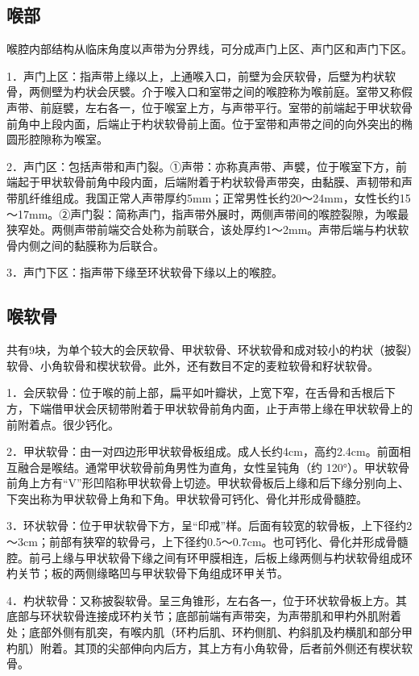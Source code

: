 \subsection{喉部}

喉腔内部结构从临床角度以声带为分界线，可分成声门上区、声门区和声门下区。

1．声门上区：指声带上缘以上，上通喉入口，前壁为会厌软骨，后壁为杓状软骨，两侧壁为杓状会厌襞。介于喉入口和室带之间的喉腔称为喉前庭。室带又称假声带、前庭襞，左右各一，位于喉室上方，与声带平行。室带的前端起于甲状软骨前角中上段内面，后端止于杓状软骨前上面。位于室带和声带之间的向外突出的椭圆形腔隙称为喉室。

2．声门区：包括声带和声门裂。①声带：亦称真声带、声襞，位于喉室下方，前端起于甲状软骨前角中段内面，后端附着于杓状软骨声带突，由黏膜、声韧带和声带肌纤维组成。我国正常人声带厚约5mm；正常男性长约20～24mm，女性长约15～17mm。②声门裂：简称声门，指声带外展时，两侧声带间的喉腔裂隙，为喉最狭窄处。两侧声带前端交合处称为前联合，该处厚约1～2mm。声带后端与杓状软骨内侧之间的黏膜称为后联合。

3．声门下区：指声带下缘至环状软骨下缘以上的喉腔。

\subsection{喉软骨}

共有9块，为单个较大的会厌软骨、甲状软骨、环状软骨和成对较小的杓状（披裂）软骨、小角软骨和楔状软骨。此外，还有数目不定的麦粒软骨和籽状软骨。

1．会厌软骨：位于喉的前上部，扁平如叶瓣状，上宽下窄，在舌骨和舌根后下方，下端借甲状会厌韧带附着于甲状软骨前角内面，止于声带上缘在甲状软骨上的前附着点。很少钙化。

2．甲状软骨：由一对四边形甲状软骨板组成。成人长约4cm，高约2.4cm。前面相互融合是喉结。通常甲状软骨前角男性为直角，女性呈钝角（约
120°）。甲状软骨前角上方有“V”形凹陷称甲状软骨上切迹。甲状软骨板后上缘和后下缘分别向上、下突出称为甲状软骨上角和下角。甲状软骨可钙化、骨化并形成骨髓腔。

3．环状软骨：位于甲状软骨下方，呈“印戒”样。后面有较宽的软骨板，上下径约2～3cm；前部有狭窄的软骨弓，上下径约0.5～0.7cm。也可钙化、骨化并形成骨髓腔。前弓上缘与甲状软骨下缘之间有环甲膜相连，后板上缘两侧与杓状软骨组成环杓关节；板的两侧缘略凹与甲状软骨下角组成环甲关节。

4．杓状软骨：又称披裂软骨。呈三角锥形，左右各一，位于环状软骨板上方。其底部与环状软骨连接成环杓关节；底部前端有声带突，为声带肌和甲杓外肌附着处；底部外侧有肌突，有喉内肌（环杓后肌、环杓侧肌、杓斜肌及杓横肌和部分甲杓肌）附着。其顶的尖部伸向内后方，其上方有小角软骨，后者前外侧还有楔状软骨。

